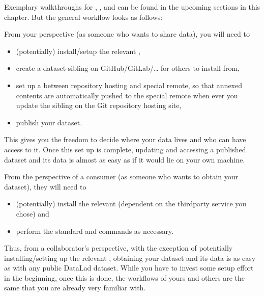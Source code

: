 \sphinxAtStartPar
Exemplary walk\sphinxhyphen{}throughs for , , and  can be found in the upcoming sections in this chapter.
But the general workflow looks as follows:

\sphinxAtStartPar
From your perspective (as someone who wants to share data), you will
need to
\begin{itemize}
\item {} 
\sphinxAtStartPar
(potentially) install/setup the relevant ,

\item {} 
\sphinxAtStartPar
create a dataset sibling on GitHub/GitLab/… for others to install from,

\item {} 
\sphinxAtStartPar
set up a  between repository hosting and special remote, so that annexed contents are automatically pushed to the special remote when ever you update the sibling on the Git repository hosting site,

\item {} 
\sphinxAtStartPar
publish your dataset.

\end{itemize}

\sphinxAtStartPar
This gives you the freedom to decide where your data lives and
who can have access to it. Once this set up is complete, updating and
accessing a published dataset and its data is almost as easy as if it would
lie on your own machine.

\sphinxAtStartPar
From the perspective of a consumer (as someone who wants to obtain your dataset),
they will need to
\begin{itemize}
\item {} 
\sphinxAtStartPar
(potentially) install the relevant  (dependent on the third\sphinxhyphen{}party service you chose) and

\item {} 
\sphinxAtStartPar
perform the standard  and  commands
as necessary.

\end{itemize}

\sphinxAtStartPar
Thus, from a collaborator’s perspective, with the exception of potentially
installing/setting up the relevant , obtaining your dataset and its
data is as easy as with any public DataLad dataset.
While you have to invest some setup effort in the beginning, once this
is done, the workflows of yours and others are the same that you are already
very familiar with.

